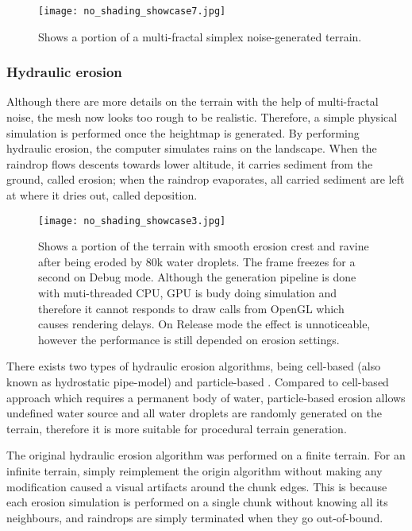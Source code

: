 \documentclass[oneside, a4paper]{article}
\begin{document}
    \begin{figure}[H]
        \texttt{[image: no\_shading\_showcase7.jpg]}
        \caption{Shows a portion of a multi-fractal simplex noise-generated terrain.}
    \end{figure}

    \subsubsection{Hydraulic erosion}

    Although there are more details on the terrain with the help of multi-fractal noise, the mesh now looks too rough to be realistic. Therefore, a simple physical simulation is performed once the heightmap is generated. By performing hydraulic erosion, the computer simulates rains on the landscape. When the raindrop flows descents towards lower altitude, it carries sediment from the ground, called erosion; when the raindrop evaporates, all carried sediment are left at where it dries out, called deposition.

    \begin{figure}[H]
        \texttt{[image: no\_shading\_showcase3.jpg]}
        \caption{Shows a portion of the terrain with smooth erosion crest and ravine after being eroded by 80k water droplets. The frame freezes for a second on Debug mode. Although the generation pipeline is done with muti-threaded CPU, GPU is budy doing simulation and therefore it cannot responds to draw calls from OpenGL which causes rendering delays. On Release mode the effect is unnoticeable, however the performance is still depended on erosion settings.}
    \end{figure}

    There exists two types of hydraulic erosion algorithms, being cell-based (also known as hydrostatic pipe-model) \cite{cell_based_erosion} and particle-based \cite{particle_based_erosion}. Compared to cell-based approach which requires a permanent body of water, particle-based erosion allows undefined water source and all water droplets are randomly generated on the terrain, therefore it is more suitable for procedural terrain generation.

    The original hydraulic erosion algorithm was performed on a finite terrain. For an infinite terrain, simply reimplement the origin algorithm without making any modification caused a visual artifacts around the chunk edges. This is because each erosion simulation is performed on a single chunk without knowing all its neighbours, and raindrops are simply terminated when they go out-of-bound.
\end{document}
